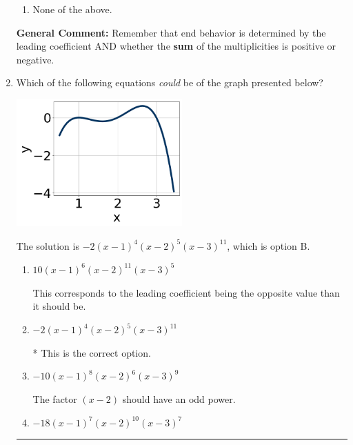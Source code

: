 \documentclass{extbook}[14pt]
\newcommand{\litem}[1]{\item #1

\rule{\textwidth}{0.4pt}}
\begin{document}
\begin{enumerate}
{\begin{enumerate}[label=\Alph*.]
\item None of the above.\end{enumerate}
\textbf{General Comment:} Remember that end behavior is determined by the leading coefficient AND whether the \textbf{sum} of the multiplicities is positive or negative.
}
\litem{
Which of the following equations \textit{could} be of the graph presented below?

\begin{center}
    \includegraphics[width=0.5\textwidth]{../Figures/polyGraphToFunctionCopyC.png}
\end{center}


The solution is \( -2(x - 1)^{4} (x - 2)^{5} (x - 3)^{11} \), which is option B.\begin{enumerate}[label=\Alph*.]
\item \( 10(x - 1)^{6} (x - 2)^{11} (x - 3)^{5} \)

This corresponds to the leading coefficient being the opposite value than it should be.
\item \( -2(x - 1)^{4} (x - 2)^{5} (x - 3)^{11} \)

* This is the correct option.
\item \( -10(x - 1)^{8} (x - 2)^{6} (x - 3)^{9} \)

The factor $(x - 2)$ should have an odd power.
\item \( -18(x - 1)^{7} (x - 2)^{10} (x - 3)^{7} \)


\end{enumerate}}
\end{enumerate}
\end{document}
